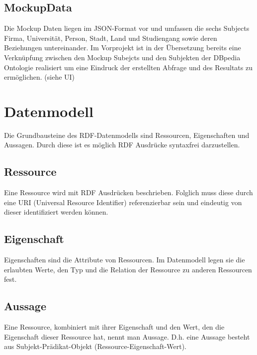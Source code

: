 \subsection*{MockupData}

Die Mockup Daten liegen im JSON-Format vor und umfassen die sechs Subjects {\glqq}Firma{\grqq}, {\glqq}Universität{\grqq}, {\glqq}Person{\grqq}, {\glqq}Stadt{\grqq}, {\glqq}Land{\grqq} und {\glqq}Studiengang{\grqq} sowie deren Beziehungen untereinander.
Im Vorprojekt ist in der Übersetzung bereits eine Verknüpfung zwischen den Mockup Subejcts und den Subjekten der DBpedia Ontologie realisiert um eine Eindruck der erstellten Abfrage und des Resultats zu ermöglichen. (siehe UI)

\section{Datenmodell}

Die Grundbausteine des RDF-Datenmodells sind Ressourcen, Eigenschaften und Aussagen. Durch diese ist es möglich RDF Ausdrücke syntaxfrei darzustellen.

\subsection*{Ressource}

Eine Ressource wird mit RDF Ausdrücken beschrieben. Folglich muss diese durch eine URI (Universal Resource Identifier) referenzierbar sein und eindeutig von dieser identifiziert werden können.

\subsection*{Eigenschaft}

Eigenschaften sind die Attribute von Ressourcen. Im Datenmodell legen sie die erlaubten Werte, den Typ und die Relation der Ressource zu anderen Ressourcen fest.

\subsection*{Aussage}

Eine Ressource, kombiniert mit ihrer Eigenschaft und den Wert, den die Eigenschaft dieser Ressource hat, nennt man {\glqq}Aussage{\grqq}. D.h. eine Aussage besteht aus Subjekt-Prädikat-Objekt (Ressource-Eigenschaft-Wert).

